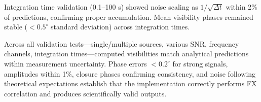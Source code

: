 Integration time validation (0.1–100 s) showed noise scaling as $1/\sqrt{\Delta t}$ within 2\% of predictions, confirming proper accumulation. Mean visibility phases remained stable ($< 0.5^\circ$ standard deviation) across integration times.

Across all validation tests—single/multiple sources, various SNR, frequency channels, integration times—computed visibilities match analytical predictions within measurement uncertainty. Phase errors $< 0.2^\circ$ for strong signals, amplitudes within 1\%, closure phases confirming consistency, and noise following theoretical expectations establish that the implementation correctly performs FX correlation and produces scientifically valid outputs.

